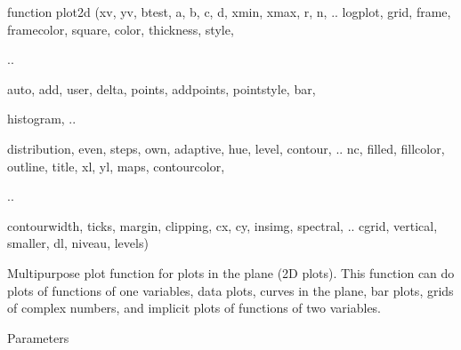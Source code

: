 \documentclass[a4paper,10pt]{article}
\begin{document}
\begin{eulernotebook}
\begin{eulercomment}
\end{eulercomment}
\begin{eulerttcomment}
  function plot2d (xv, yv, btest, a, b, c, d, xmin, xmax, r, n,  ..
  logplot, grid, frame, framecolor, square, color, thickness, style,
\end{eulerttcomment}
\begin{eulercomment}
..\\
\end{eulercomment}
\begin{eulerttcomment}
  auto, add, user, delta, points, addpoints, pointstyle, bar,
\end{eulerttcomment}
\begin{eulercomment}
histogram,  ..\\
\end{eulercomment}
\begin{eulerttcomment}
  distribution, even, steps, own, adaptive, hue, level, contour,  ..
  nc, filled, fillcolor, outline, title, xl, yl, maps, contourcolor,
\end{eulerttcomment}
\begin{eulercomment}
..\\
\end{eulercomment}
\begin{eulerttcomment}
  contourwidth, ticks, margin, clipping, cx, cy, insimg, spectral,  ..
  cgrid, vertical, smaller, dl, niveau, levels)
\end{eulerttcomment}
\begin{eulercomment}

Multipurpose plot function for plots in the plane (2D plots). This
function can do plots of functions of one variables, data plots,
curves in the plane, bar plots, grids of complex numbers, and implicit
plots of functions of two variables.

Parameters


\end{eulercomment}
\end{eulernotebook}
\end{document}
